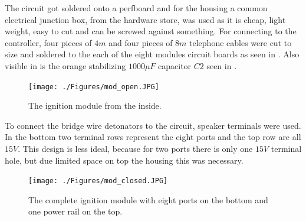 \noindent The circuit got soldered onto a perfboard and for the housing a common electrical junction box, from the hardware store, was used as it is cheap, light weight, easy to cut and can be screwed against something. For connecting to the controller, four pieces of $4m$ and four pieces of $8m$ telephone cables were cut to size and soldered to the each of the eight modules circuit boards as seen in . Also visible in  is the orange stabilizing $1000 \mu F$ capacitor $C2$ seen in .

\begin{figure}[!ht]
    \centering
    \texttt{[image: ./Figures/mod\_open.JPG]}
    \caption{The ignition module from the inside.}
    \label{fig:mod_open}     
\end{figure}

\noindent To connect the bridge wire detonators to the circuit, speaker terminals were used.  In  the bottom two terminal rows represent the eight ports and the top row are all $15V$. This design is less ideal, because for two ports there is only one $15V$ terminal hole, but due limited space on top the housing this was necessary.  \\

\begin{figure}[!ht]
    \centering
    \texttt{[image: ./Figures/mod\_closed.JPG]}
    \caption{The complete ignition module with eight ports on the bottom and one power rail on the top.}
    \label{fig:mod_closed}     
\end{figure}
\pagebreak
